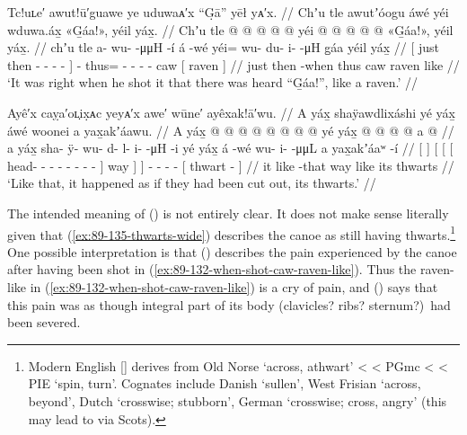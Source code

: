 \ex\label{ex:89-132-when-shot-caw-raven-like}%
%
\begingl
	\glpreamble	Tc!uʟe′ awut!ū′guawe ye uduwaᴀ′x “G̣ā” yēł yᴀ′x. //
	\glpreamble	Chʼu tle awutʼóogu áwé yéi wduwa.áx̱ «\!G̱áa!\!», yéil yáx̱. //
	\gla	{} Chʼu tle  @ {} @ {} @ {} @ {} {}
		 @ {}
		yéi @  @ {} @ {} @ {} @ {}
		«\!G̱áa!\!»,
		{} yéil yáx̱. {} //
	\glb	{} chʼu tle a- wu-  -μμH -í {}
		á -wé
		yéi= wu- du- i-  -μH
		\pqp{}g̱áa
		{} yéil yáx̱ {} //
	\glc	{}[ just then - -  - - {}]
		 -
		thus= - - -  -
		\pqp{}caw
		{}[ raven  {}] //
	\gld	{} just then  {} {} {} -when {}
		 {}
		thus\•  {} {} {} {}
		\pqp{}caw
		{} raven like {} //
	\glft	‘It was right when he shot it that there was heard “G̱áa!”, like a raven.’
		//
\endgl
\xe

\ex\label{ex:89-133-like-its-thwarts-were-cut}%
%
\begingl
	\glpreamble	Ayê′x caỵa′oʟ̣ix̣ᴀc yeyᴀ′x awe′ wūne′ ayêxak!ā′wu. //
	\glpreamble	A yáx̱ shaÿawdlixáshi yé yáx̱ áwé woonei a yax̱akʼáawu. //
	\gla	{} A yáx̱ {}
		{} {} {}  @ {} @ {} @ {} @ {} @ {} @ {} @ {} @ {} {}
			yé {} yáx̱ {}
		 @ {}
		 @ {} @ {} @ {} 
		{} a  @ {} {} //
	\glb	{} a yáx̱ {}
		{} {} {} sha- ÿ- wu- d- l- i-  -μH -i {}
			yé {} yáx̱ {}
		á -wé
		wu- i-  -μμL
		{} a yax̱akʼáaʷ -í {} //
	\glc	{}[   {}]
		{}[ {}[ {}[
				head- - - - - -  - - {}]
			way {}]  {}]
		 -
		- -  -
		{}[  thwart - {}] //
	\gld	{} it like {}
		{} {} {}  {} {} {} {} {} {} {} -that {}
			way {} like {}
		 {}
		 {} {} {}
		{} its thwarts {} {} //
	\glft	‘Like that, it happened as if they had been cut out, its thwarts.’
		//
\endgl
\xe

The intended meaning of (\lastx) is not entirely clear.
It does not make sense literally given that (\ref{ex:89-135-thwarts-wide}) describes the canoe as still having thwarts.\footnote{Modern English  [] derives from Old Norse  ‘across, athwart’ <  < PGmc  <  < PIE  ‘spin, turn’.
Cognates include Danish  ‘sullen’, West Frisian  ‘across, beyond’, Dutch  ‘crosswise; stubborn’, German  ‘crosswise; cross, angry’ (this may lead to  via Scots).} One possible interpretation is that (\lastx) describes the pain experienced by the canoe after having been shot in (\ref{ex:89-132-when-shot-caw-raven-like}).
Thus the raven-like  in (\ref{ex:89-132-when-shot-caw-raven-like}) is a cry of pain, and (\lastx) says that this pain was as though integral part of its body (clavicles? ribs? sternum?)\ had been severed.

